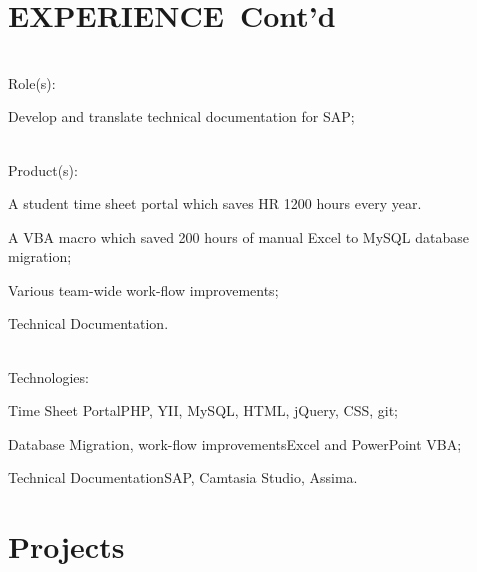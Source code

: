 \documentclass[letterpaper]{deedy-resume} %
\begin{document}
\section{EXPERIENCE~\small{Cont'd}}


\\[\fpeval{\baseheight}]

Role(s):

\begin{tightitemize}
    \item Develop and translate technical documentation for SAP;
\end{tightitemize}

\\[\fpeval{\baseheight}]

Product(s):
\begin{tightitemize}
    \item A student time sheet portal which saves HR 1200 hours every year.
    \item A VBA macro which saved 200 hours of manual Excel to MySQL database migration;
    \item Various team-wide work-flow improvements;
    \item Technical Documentation.
\end{tightitemize}

\\[\fpeval{\baseheight}]

Technologies: \\
\begin{tightitemize}
    \item Time Sheet Portal\textemdash PHP, YII, MySQL, HTML, jQuery, CSS, git;
    \item Database Migration, work-flow improvements\textemdash Excel and PowerPoint VBA;
    \item Technical Documentation\textemdash SAP, Camtasia Studio, Assima.
\end{tightitemize}

\sectionspace %


\section{Projects}
\end{document}
